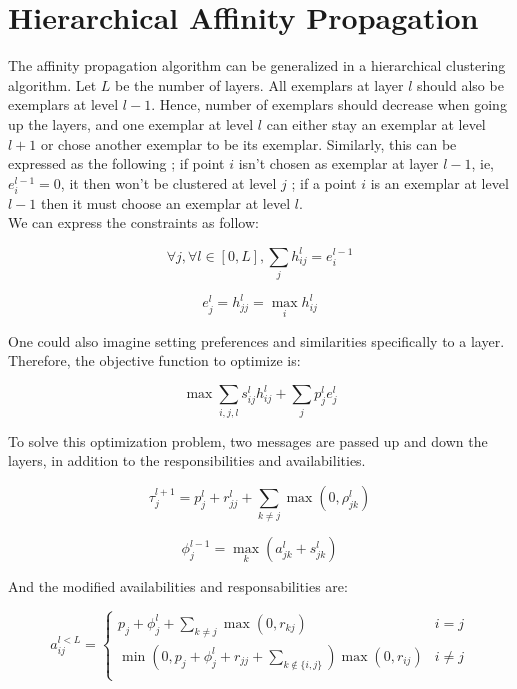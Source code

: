 \documentclass{ipol}
\begin{document}
\section{Hierarchical Affinity Propagation}

The affinity propagation algorithm can be generalized in a hierarchical
clustering algorithm. Let $L$ be the number of layers. All exemplars at layer
$l$ should also be exemplars at level $l -1$. Hence, number of exemplars
should decrease when going up the layers, and one exemplar at level $l$ can
either stay an exemplar at level $l + 1$ or chose another exemplar to be its
exemplar. Similarly, this can be expressed as the following ; if point $i$ isn't chosen as
exemplar at layer $l - 1$, ie, $e_{i}^{l - 1} = 0$, it then won't be clustered at
level $j$ ; if a point $i$ is an exemplar at level $l -1$ then it must choose
an exemplar at level $l$.\\
We can express the constraints as follow:

\begin{equation}
\forall j, \forall l \in [0, L], \sum_{j} h_{ij}^l = e_i^{l-1}
\end{equation}

\begin{equation}
e_j^l = h_{jj}^l = \max_i h_{ij}^l
\end{equation}

One could also imagine setting preferences and similarities specifically to a
layer. Therefore, the objective function to optimize is:

\begin{equation}
\max \sum_{i, j, l} s^l_{ij} h^l_{ij} + \sum_{j} p^l_j e^l_j
\end{equation}

To solve this optimization problem, two messages are passed up and down the
layers, in addition to the responsibilities and availabilities.

\begin{equation}
\tau_j^{l + 1} = p^l_j + r_{jj}^l + \sum_{k \neq j} \max (0, \rho^l_{jk})
\end{equation}

\begin{equation}
\phi_j^{l - 1} = \max_k (a_{jk}^l + s_{jk}^l)
\end{equation}

And the modified availabilities and responsabilities are:

\begin{equation}
a_{ij}^{l < L} = \begin{cases}
	    p_j + \phi_j^l + \sum_{k \neq j} \max(0, r_{kj}) &  i = j \\
	    \min ( 0, p_j + \phi_j^l + r_{jj} + \sum_{k \notin \{i, j\} } ) \max (0, r_{ij}) & i \neq j\\
	 \end{cases}
\end{equation}
\end{document}
